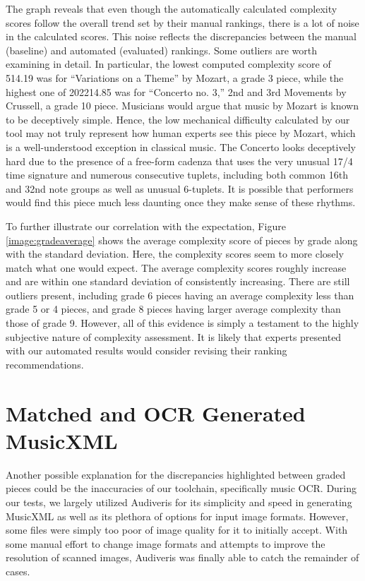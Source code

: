 \documentclass[12pt]{report}
\begin{document}
The graph reveals that even though the automatically calculated complexity scores follow the overall trend set by their manual rankings, there is a lot of noise in the calculated scores. This noise reflects the discrepancies between the manual (baseline) and automated (evaluated) rankings. Some outliers are worth examining in detail. In particular, the lowest computed complexity score of 514.19 was for ``Variations on a Theme'' by Mozart, a grade 3 piece, while the highest one of 202214.85 was for ``Concerto no. 3,'' 2nd and 3rd Movements by Crussell, a grade 10 piece. Musicians would argue that music by Mozart is known to be deceptively simple. Hence, the low mechanical difficulty calculated by our tool may not truly represent how human experts see this piece by Mozart, which is a well-understood exception in classical music. The Concerto looks deceptively hard due to the presence of a free-form cadenza that uses the very unusual 17/4 time signature and numerous consecutive tuplets, including both common 16th and 32nd note groups as well as unusual 6-tuplets. It is possible that performers would find this piece much less daunting once they make sense of these rhythms. 


To further illustrate our correlation with the expectation, Figure \ref{image:gradeaverage} shows the average complexity score of pieces by grade along with the standard deviation. Here, the complexity scores seem to more closely match what one would expect. The average complexity scores roughly increase and are within one standard deviation of consistently increasing. There are still outliers present, including grade 6 pieces having an average complexity less than grade 5 or 4 pieces, and grade 8 pieces having larger average complexity than those of grade 9. However, all of this evidence is simply a testament to the highly subjective nature of complexity assessment. It is likely that experts presented with our automated results would consider revising their ranking recommendations.

\section{Matched and OCR Generated MusicXML}
\label{sec:disocr}

Another possible explanation for the discrepancies highlighted between graded pieces could be the inaccuracies of our toolchain, specifically music OCR. During our tests, we largely utilized Audiveris \cite{Audiveris} for its simplicity and speed in generating MusicXML as well as its plethora of options for input image formats. However, some files were simply too poor of image quality for it to initially accept. With some manual effort to change image formats and attempts to improve the resolution of scanned images, Audiveris was finally able to catch the remainder of cases.
\end{document}
